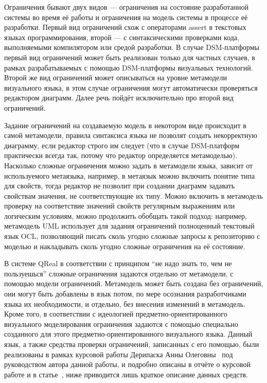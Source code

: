 Ограничения бывают двух видов --- ограничения на состояние разработанной системы во 
время её работы и ограничения на модель системы в процессе её разработки. Первый 
вид ограничений схож с операторами assert в текстовых языках программирования, второй --- 
с синтаксическими проверками кода, выполняемыми компилятором или средой разработки. 
В случае DSM-платформы первый вид ограничений может быть реализован только для частных 
случаев, в рамках разрабатываемых с помощью DSM-платформы визуальных технологий. Второй 
же вид ограничений может описываться на уровне метамодели визуального языка, в этом 
случае ограничения могут автоматически проверяться редактором диаграмм. Далее речь 
пойдёт исключительно про второй вид ограничений.

Задание ограничений на создаваемую модель в некотором виде происходит в самой метамодели, 
правила синтаксиса языка не позволят создать некорректную диаграмму, если редактор строго 
им следует (что в случае DSM-платформ практически всегда так, потому что редактор 
определяется метамоделью). Насколько сложные ограничения можно задать в метамодели 
языка, зависит от используемого метаязыка, например, в метаязык можно включить понятие 
типа для свойств, тогда редактор не позволит при создании диаграмм задавать свойствам 
значения, не соответствующие их типу. Можно включить в метамодель проверку на соответствие 
значений свойств регулярным выражениям или логическим условиям, можно продолжить обобщать 
такой подход: например, метамодель UML использует для задания ограничений полноценный 
текстовый язык OCL, позволяющий писать сколь угодно сложные запросы к репозиторию с 
моделью и накладывать сколь угодно сложные ограничения на её состояние.

В системе QReal в соответствии с принципом "`не надо знать то, чем не пользуешься"' 
сложные ограничения задаются отдельно от метамодели, с помощью модели ограничений. 
Метамодель может быть создана без ограничений, они могут быть добавлены в язык потом,
по мере осознания разработчиками языка их необходимости, и отдельно, без внесения 
изменений в метамодель. Кроме того, в соответствии с идеологией предметно-ориентированного 
визуального моделирования ограничения задаются с помощью специально созданного для 
этого предметно-ориентированного визуального языка. Данный язык, а также средства 
проверки ограничений, записанных с его помощью, были реализованы в рамках курсовой 
работы Дерипаска Анны Олеговны~\cite{deripaska2012course}
под руководством автора данной работы, и подробно описаны в отчёте о курсовой работе и в 
статье~\cite{deripaska2013constraints}, ниже приводится лишь краткое описание данных средств.


